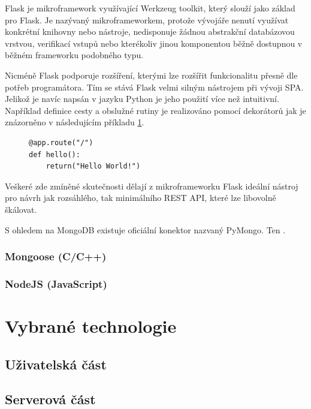 Flask je mikroframework využívající Werkzeug toolkit, který slouží jako základ pro Flask. Je nazývaný mikroframeworkem, protože vývojáře nenutí využívat konkrétní knihovny nebo nástroje, nedisponuje žádnou abstrakční databázovou vrstvou, verifikací vstupů nebo kterékoliv jinou komponentou běžně dostupnou v běžném frameworku podobného typu.

Nicméně Flask podporuje rozšíření, kterými lze rozšířit funkcionalitu přesně dle potřeb programátora. Tím se stává Flask velmi silným nástrojem při vývoji SPA. Jelikož je navíc napsán v jazyku Python je jeho použití více než intuitivní. Například definice cesty a obslužné rutiny je realizováno pomocí dekorátorů jak je znázorněno v následujícím příkladu \ref{code:flask}.

\begin{figure}[h]
\lstset{basicstyle=\small,style=JSON}
\begin{lstlisting}
@app.route("/")
def hello():
    return("Hello World!")
\end{lstlisting}
\label{code:flask}
\end{figure}

Veškeré zde zmíněné skutečnosti dělají z mikroframeworku Flask ideální nástroj pro návrh jak rozsáhlého, tak minimálního REST API, které lze libovolně škálovat.

S ohledem na MongoDB existuje oficiální konektor nazvaný PyMongo. Ten . 


\subsubsection*{Mongoose (C/C++)}
\subsubsection*{NodeJS (JavaScript)}



\section{Vybrané technologie}
\subsection{Uživatelská část}

\subsection{Serverová část}


